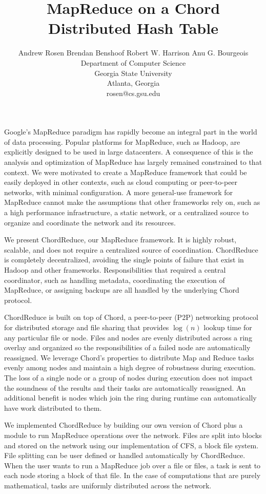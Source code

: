 \documentclass[11pt,letterpaper]{article}
\title{\large MapReduce on a Chord Distributed Hash Table }
\author{\small Andrew Rosen \qquad Brendan Benshoof  \qquad Robert W. Harrison \qquad Anu G. Bourgeois \\ \small Department of Computer Science\\
\small Georgia State University\\
\small Atlanta, Georgia\\
\small rosen@cs.gsu.edu}
\date{}
\begin{document}
\maketitle

Google's MapReduce paradigm has rapidly become an integral part in the world of data processing.
Popular platforms for MapReduce, such as Hadoop, are explicitly designed to be used in large datacenters.  
A consequence of this is the analysis and optimization of MapReduce has largely remained constrained to that context.  
We were motivated to create a MapReduce framework that could be easily deployed in other contexts, such as cloud computing or peer-to-peer networks, with minimal configuration.
A more general-use framework for MapReduce cannot make the assumptions that other frameworks rely on, such as a high performance infrastructure, a static network, or a centralized source to organize and coordinate the network and its resources.  

We present ChordReduce, our MapReduce framework.  It is highly robust, scalable, and does not require a centralized source of coordination.  ChordReduce is completely decentralized, avoiding the single points of failure that exist in Hadoop and other frameworks. Responsibilities  that required a central coordinator, such as handling metadata, coordinating the execution of MapReduce, or assigning backups are all handled by the underlying Chord protocol.

ChordReduce is built on top of Chord, a peer-to-peer (P2P) networking protocol for distributed storage and file sharing that provides $\log(n)$ lookup time for any particular file or node.
Files and nodes are evenly distributed across a ring overlay and organized so the responsibilities of a failed node are automatically reassigned. 
We leverage Chord's properties to distribute Map and Reduce tasks evenly among nodes and maintain a high degree of robustness during execution.  
The loss of a single node or a group of nodes during execution does not impact the soundness of the results and their tasks are automatically reassigned. 
An additional benefit is nodes which join the ring during runtime can automatically have work distributed to them.


We implemented ChordReduce by building our own version of Chord plus a module to run MapReduce operations over the network. Files are split into blocks and stored on the network using our implementation of CFS, a block file system.  File splitting can be user defined or handled automatically by ChordReduce.  When the user wants to run a MapReduce job over a file or files, a task is sent to each node storing a block of that file.  In the case of computations that are purely mathematical, tasks are uniformly distributed across the network.
\end{document}
